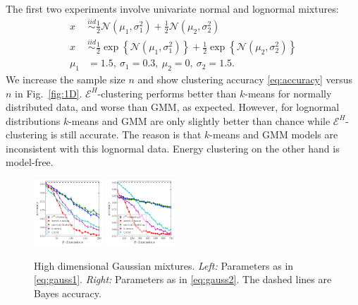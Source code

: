 \documentclass{article}
\begin{document}
The first two experiments involve univariate
normal and lognormal mixtures:
\begin{align}
x &\stackrel{iid}{\sim} \tfrac{1}{2}
\mathcal{N}(\mu_1,\sigma_1^2) + 
\tfrac{1}{2} \mathcal{N}(\mu_2,\sigma_2^2) \label{eq:uni_normal} \\
x & \stackrel{iid}{\sim} \tfrac{1}{2}
\exp\left\{ \mathcal{N}(\mu_1,\sigma_1^2) \right\} + 
\tfrac{1}{2} \exp \left\{ \mathcal{N}(\mu_2,\sigma_2^2)\right\} 
\label{eq:uni_lognormal} \\
\mu_1 &= 1.5, \ \sigma_1=0.3, \ \mu_2=0, \ \sigma_2=1.5.
\label{eq:uni_params}
\end{align}
We increase the sample size $n$ and show clustering accuracy 
\eqref{eq:accuracy}
versus $n$ in Fig.~\ref{fig:1D}. $\mathcal{E}^H$-clustering 
performs better than $k$-means for normally distributed data, 
and worse than GMM,
as expected. 
However, for lognormal distributions $k$-means and GMM are only slightly
better than chance while $\mathcal{E}^H$-clustering is still 
accurate. The reason is that $k$-means and GMM models are inconsistent
with this lognormal data. Energy clustering on the other hand
is model-free.

\begin{figure}
\includegraphics[width=0.23\textwidth]{normal_highdim_mean.pdf}
\includegraphics[width=0.23\textwidth]{normal_highdim_cov.pdf}
\caption{
\label{fig:gauss}
High dimensional Gaussian mixtures.
\emph{Left:} Parameters as in \eqref{eq:gauss1}.
\emph{Right:} Parameters  as in \eqref{eq:gauss2}. 
The dashed lines are Bayes accuracy.
}
\end{figure} 
\end{document}
